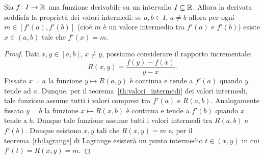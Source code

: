 \begin{theorem}
  \label{th:darboux}%
  Sia $f\colon I \to {\mathbb R}$ una funzione derivabile su un intervallo $I\subseteq {\mathbb R}$.
  Allora la derivata soddisfa la proprietà dei valori intermedi:
  se $a,b\in I$, $a\neq b$ allora per ogni $m\in [f'(a),f'(b)]$ 
  (cioè $m$ è un valore intermedio tra 
  $f'(a)$ e $f'(b)$)
  esiste $x\in(a,b)$ tale che $f'(x) = m$. 
\end{theorem}
\begin{proof}
Dati $x,y\in [a,b]$, $x\neq y$, possiamo considerare 
il rapporto incrementale:
  \[
    R(x,y) = \frac{f(y)-f(x)}{y-x}.
  \]
Fissato $x=a$ la funzione $y\mapsto R(a,y)$ è continua e tende a $f'(a)$
quando $y$ tende ad $a$.
Dunque, per il teorema~\ref{th:valori_intermedi} dei valori intermedi,
tale funzione assume tutti i valori compresi tra $f'(a)$ e 
$R(a,b)$. Analogamente fissato $y=b$ la funzione $x\mapsto R(x,b)$ 
è continua e tende a $f'(b)$ quando $x$ tende a $b$.
Dunque tale funzione assume tutti i valori intermedi 
tra $R(a,b)$ e $f'(b)$. 
Dunque esistono $x,y$ tali 
che $R(x,y)=m$ e, per il teorema~\ref{th:lagrange}
di Lagrange
esisterà un punto intermedio $t\in(x,y)$ in cui 
$f'(t)=R(x,y) = m$.
\end{proof}


